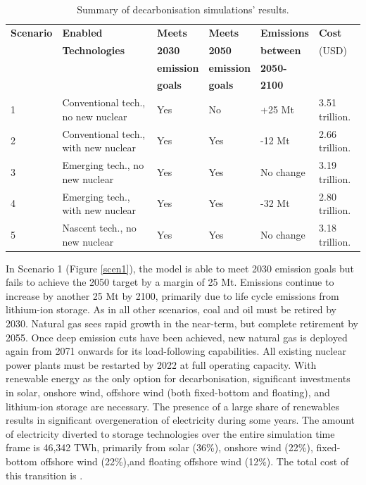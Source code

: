\begin{table}[H]
\centering
	\caption{Summary of decarbonisation simulations' results.}
	\vspace{0.1in}
	\begin{tabularx}{0.9\textwidth}{p{} p{}p{}p{}p{}p{}}
		\hline
\textbf{Scenario} & \textbf{Enabled} & \textbf{Meets} & \textbf{Meets} & \textbf{Emissions} & \textbf{Cost} \\
 & \textbf{Technologies} & \textbf{2030} & \textbf{2050} & \textbf{between} & (USD) \\
 &  & \textbf{emission} & \textbf{emission} & \textbf{2050-} &  \\
 &  & \textbf{goals} & \textbf{goals} & \textbf{2100} &  \\
\hline
1 & Conventional tech., no new nuclear & Yes & No & +25 Mt & 3.51 trillion. \\
2 & Conventional tech., with new nuclear & Yes & Yes & -12 Mt & 2.66 trillion. \\
3 & Emerging tech., no new nuclear & Yes & Yes & No change & 3.19 trillion. \\
4 & Emerging tech., with new nuclear & Yes & Yes & -32 Mt & 2.80 trillion. \\
5 & Nascent tech., no new nuclear & Yes & Yes & No change & 3.18 trillion. \\
\hline 
	\end{tabularx}
\label{tab:results_summary}
\end{table}

In Scenario 1 (Figure \ref{scen1}), the model is able to meet 2030 emission goals but fails to achieve the 2050 target by a margin of 25 Mt. Emissions continue to increase by another 25 Mt by 2100, primarily due to life cycle emissions from lithium-ion storage. As in all other scenarios, coal and oil must be retired by 2030. Natural gas sees rapid growth in the near-term, but complete retirement by 2055. Once deep emission cuts have been achieved, new natural gas is deployed again from 2071 onwards for its load-following capabilities. All existing nuclear power plants must be restarted by 2022 at full operating capacity. With renewable energy as the only option for decarbonisation, significant investments in solar, onshore wind, offshore wind (both fixed-bottom and floating), and lithium-ion storage are necessary. The presence of a large share of renewables results in significant overgeneration of electricity during some years. The amount of electricity diverted to storage technologies over the entire simulation time frame is 46,342 TWh, primarily from solar (36\%), onshore wind (22\%), fixed-bottom offshore wind (22\%),and floating offshore wind (12\%). The total cost of this transition is 
 .

